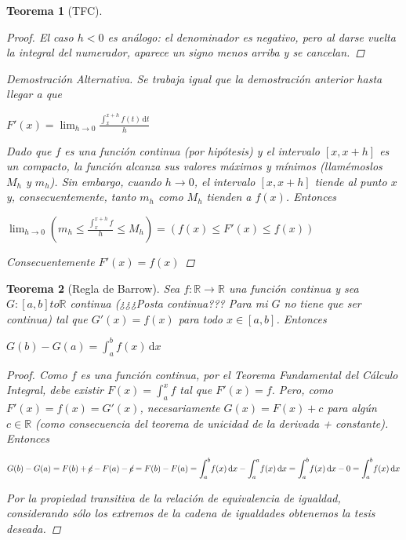 \documentclass[]{article}
\newtheorem{teo}{Teorema}
\def\R{\mathbb{R}}
\newcommand{\integral}[4]{\int_{#1}^{#2} \! #3 \, \mathrm{d}#4}
\newcommand{\intres}[3]{\int_{#1}^{#2} \! #3}
\begin{document}
\begin{teo}[TFC]
\begin{proof}
		El caso $h<0$ es análogo: el denominador es negativo, pero al darse vuelta la integral del numerador, aparece un signo menos arriba y se cancelan.
	\end{proof}		
	\begin{proof}[Demostración Alternativa]
		Se trabaja igual que la demostración anterior hasta llegar a que
		\begin{center}
			$\displaystyle F'(x) = \lim_{h\to 0}\frac{\integral{x}{x+h}{f(t)}{t}}{h}$
		\end{center}
		
		Dado que $f$ es una función continua (por hipótesis) y el intervalo $[x,x+h]$ es un compacto, la función alcanza sus valores máximos y mínimos (llamémoslos $M_h$ y $m_h$). Sin embargo, cuando $h\to 0$, el intervalo $[x,x+h]$ tiende al punto $x$ y, consecuentemente, tanto $m_h$ como $M_h$ tienden a $f(x)$. Entonces
		\begin{center}
			$\displaystyle \lim_{h\to 0} \left(m_h \leq \frac{\intres{x}{x+h}{f}}{h} \leq M_h\right) = \left(f(x) \leq F'(x) \leq f(x)\right)$
		\end{center}
		Consecuentemente $F'(x) = f(x)$
		\end{proof}
\end{teo}

\begin{teo}[Regla de Barrow]
	Sea $f:\R\to\R$ una función continua y sea $G:[a,b]to\R$ continua (¿¿¿Posta continua??? Para mi $G$ no tiene que ser continua) tal que $G'(x) = f(x)$ para todo $x\in[a,b]$. Entonces
	\begin{center}
		$\displaystyle G(b)-G(a) = \integral{a}{b}{f(x)}{x}$
	\end{center}
	\begin{proof}
		Como $f$ es una función continua, por el Teorema Fundamental del Cálculo Integral, debe existir $F(x)=\intres{a}{x}{f}$ tal que $F'(x)=f$. Pero, como $F'(x) = f(x) = G'(x)$, necesariamente $G(x) = F(x)+c$ para algún $c\in\R$ (como consecuencia del teorema de unicidad de la derivada + constante). Entonces
		\begin{center}
			$\displaystyle G(b) - G(a) = F(b) + \cancel{c} - F(a)-\cancel{c} = F(b) - F(a) = \integral{a}{b}{f(x)}{x} - \integral{a}{a}{f(x)}{x} = \integral{a}{b}{f(x)}{x} - 0 = \integral{a}{b}{f(x)}{x}$
		\end{center}
		
		Por la propiedad transitiva de la relación de equivalencia de igualdad, considerando sólo los extremos de la cadena de igualdades obtenemos la tesis deseada.
	\end{proof}
\end{teo}
\end{document}

